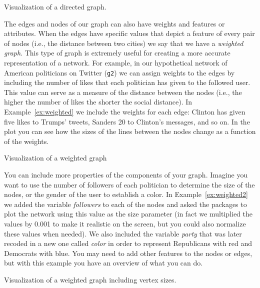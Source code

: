 \begin{ccsexample}
  \caption{Visualization of a directed graph.}
  \label{ex:visdirected}
\end{ccsexample}


The edges and nodes of our graph can also have weights and features or attributes. When the edges have specific values that depict a feature of every pair of nodes (i.e., the distance between two cities) we say that we have a \textit{weighted graph}. This type of graph is extremely useful for creating a more accurate representation of a network. For example, in our hypothetical network of American politicians on Twitter (\texttt{g2}) we can assign weights to the edges by including the number of likes that each politician has given to the followed user. This value  can serve as a measure of the distance between the nodes (i.e., the higher the number of likes the shorter the social distance). In Example~\ref{ex:weighted} we include the weights for each edge: Clinton has given five likes to Trumps' tweets, Sanders 20 to Clinton's messages, and so on. In the plot you can see how the sizes of the lines between the nodes change as a function of the weights.

\begin{ccsexample}
  \caption{Visualization of a weighted graph}
  \label{ex:weighted}
\end{ccsexample}


You can include more properties of the components of your graph. Imagine you want to use the number of followers of each politician to determine the size of the nodes, or the gender of the user to establish a color. In Example~\ref{ex:weighted2} we added the variable \emph{followers} to each of the nodes and asked the packages to plot the network using this value as the size parameter (in fact we multiplied the values by 0.001 to make it realistic on the screen, but you could also normalize these values when needed). We also included the variable \emph{party} that was later recoded in a new one called \emph{color} in order to represent Republicans with red and Democrats with blue.  You may need to add other features to the nodes or edges, but with this example you have an overview of what you can do.

\begin{ccsexample}
  \caption{Visualization of a weighted graph including vertex sizes.}
  \label{ex:weighted2}
\end{ccsexample}

